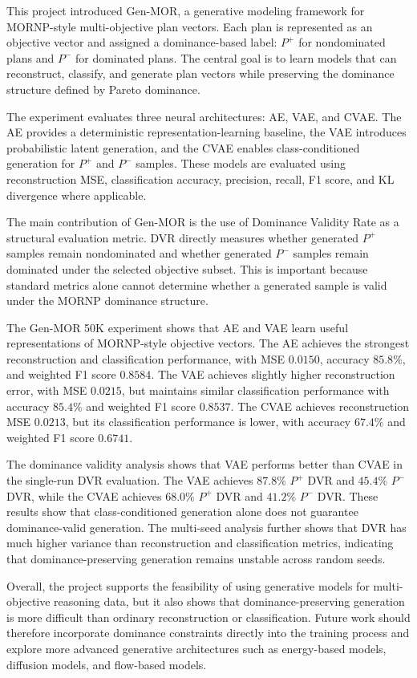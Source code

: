 \documentclass[runningheads]{llncs}
\begin{document}
This project introduced Gen-MOR, a generative modeling framework for MORNP-style multi-objective plan vectors. Each plan is represented as an objective vector and assigned a dominance-based label: $P^{+}$ for nondominated plans and $P^{-}$ for dominated plans. The central goal is to learn models that can reconstruct, classify, and generate plan vectors while preserving the dominance structure defined by Pareto dominance.

The experiment evaluates three neural architectures: AE, VAE, and CVAE. The AE provides a deterministic representation-learning baseline, the VAE introduces probabilistic latent generation, and the CVAE enables class-conditioned generation for $P^{+}$ and $P^{-}$ samples. These models are evaluated using reconstruction MSE, classification accuracy, precision, recall, F1 score, and KL divergence where applicable.

The main contribution of Gen-MOR is the use of Dominance Validity Rate as a structural evaluation metric. DVR directly measures whether generated $P^{+}$ samples remain nondominated and whether generated $P^{-}$ samples remain dominated under the selected objective subset. This is important because standard metrics alone cannot determine whether a generated sample is valid under the MORNP dominance structure.

The Gen-MOR 50K experiment shows that AE and VAE learn useful representations of MORNP-style objective vectors. The AE achieves the strongest reconstruction and classification performance, with MSE $0.0150$, accuracy $85.8\%$, and weighted F1 score $0.8584$. The VAE achieves slightly higher reconstruction error, with MSE $0.0215$, but maintains similar classification performance with accuracy $85.4\%$ and weighted F1 score $0.8537$. The CVAE achieves reconstruction MSE $0.0213$, but its classification performance is lower, with accuracy $67.4\%$ and weighted F1 score $0.6741$.

The dominance validity analysis shows that VAE performs better than CVAE in the single-run DVR evaluation. The VAE achieves $87.8\%$ $P^{+}$ DVR and $45.4\%$ $P^{-}$ DVR, while the CVAE achieves $68.0\%$ $P^{+}$ DVR and $41.2\%$ $P^{-}$ DVR. These results show that class-conditioned generation alone does not guarantee dominance-valid generation. The multi-seed analysis further shows that DVR has much higher variance than reconstruction and classification metrics, indicating that dominance-preserving generation remains unstable across random seeds.

Overall, the project supports the feasibility of using generative models for multi-objective reasoning data, but it also shows that dominance-preserving generation is more difficult than ordinary reconstruction or classification. Future work should therefore incorporate dominance constraints directly into the training process and explore more advanced generative architectures such as energy-based models, diffusion models, and flow-based models.
%

\vspace{-10pt}

\end{document}
